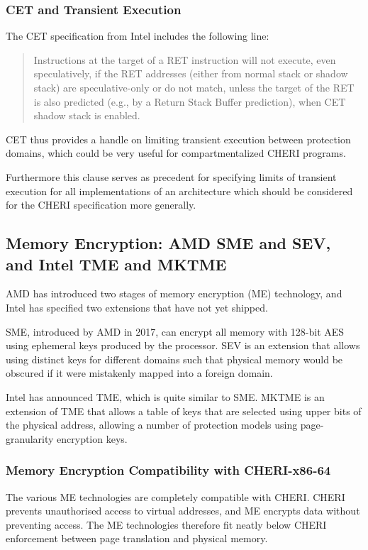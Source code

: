 \subsubsection{CET and Transient Execution}
The CET specification from Intel includes the following line:
\begin{quote}
Instructions at the target of a RET instruction will not execute,
even speculatively, if the RET addresses (either from normal stack
or shadow stack) are speculative-only or do not match, unless the
target of the RET is also predicted (e.g., by a Return Stack Buffer
prediction), when CET shadow stack is enabled.
\end{quote}

CET thus provides a handle on limiting transient execution
between protection domains, which could be very useful
for compartmentalized CHERI programs.

Furthermore this clause serves as precedent for specifying
limits of transient execution for all implementations of an architecture
which should be considered for the CHERI specification more generally.

\subsection{Memory Encryption: AMD SME and SEV, and Intel TME and MKTME}

AMD has introduced two stages of memory encryption (ME) technology,
and Intel has specified two extensions that have not yet shipped.

SME, introduced by AMD in 2017, can encrypt all memory with 128-bit
AES using ephemeral keys produced by the processor.
SEV is an extension that allows using distinct keys for different
domains such that physical memory would be obscured
if it were mistakenly mapped into a foreign domain.

Intel has announced TME, which is quite similar to SME.
MKTME is an extension of TME that allows a table of keys that are
selected using upper bits of the physical address, allowing a number
of protection models using page-granularity encryption keys.

\subsubsection{Memory Encryption Compatibility with CHERI-x86-64}

The various ME technologies are completely compatible
with CHERI.
CHERI prevents unauthorised access to virtual addresses, and ME
encrypts data without preventing access.
The ME technologies therefore fit neatly below CHERI enforcement
between page translation and physical memory.

